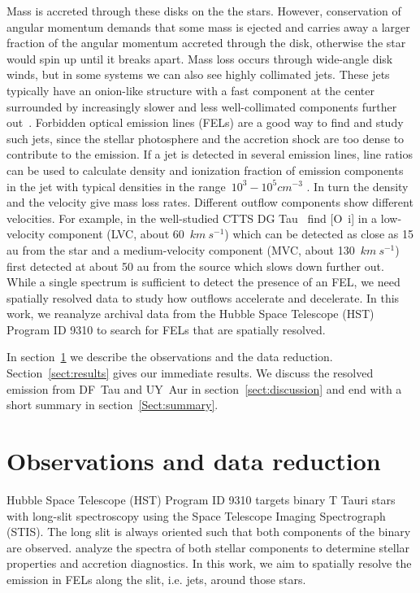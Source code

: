 \documentclass[twocolumn]{aastex62}
\begin{document}
Mass is accreted through these disks on the the stars. However,
conservation of angular momentum demands that some mass is ejected and
carries away a larger fraction of the angular momentum accreted through
the disk, otherwise the star would spin up until it breaks apart. Mass
loss occurs through wide-angle disk winds, but in some systems we can
also see highly collimated jets. These jets typically have an onion-like
structure with a fast component at the center surrounded by increasingly
slower and less well-collimated components further
out~\cite{2000ApJ...537L..49B}. Forbidden optical emission lines (FELs) are a
good way to find and study such jets, since the stellar photosphere and
the accretion shock are too dense to contribute to the emission. If a
jet is detected in several emission lines, line ratios can be used to
calculate density and ionization fraction of emission components in the
jet with typical densities in the range~$10^3-10^5cm^{-3}$
\citep[e.g.][]{1999A&A...342..717B,2000A&A...356L..41L,2013A&A...550L...1S}. In turn
the density and the velocity give mass loss rates. Different outflow
components show different velocities. For example, in the well-studied
CTTS DG Tau~\citet{2013A&A...550L...1S} find [O~{\sc i}] in a low-velocity
component (LVC, about 60~\(km\ s^{-1}\)) which can be detected as
close as 15 au from the star and a medium-velocity component (MVC, about
130~\(km\ s^{-1}\)) first detected at about 50 au from the source
which slows down further out. While a single spectrum is sufficient to
detect the presence of an FEL, we need spatially resolved data to study
how outflows accelerate and decelerate. In this work, we reanalyze
archival data from the Hubble Space Telescope (HST) Program ID 9310 to
search for FELs that are spatially resolved.

In section~\ref{sect:obs} we describe the observations and the data reduction. Section~\ref{sect:results} gives our immediate results. We discuss the resolved emission from DF~Tau and UY~Aur in section~\ref{sect:discussion} and end with a short summary in section~\ref{Sect:summary}.

\section{Observations and data reduction}
\label{sect:obs}

Hubble Space Telescope (HST) Program ID 9310 targets binary T Tauri
stars with long-slit spectroscopy using the Space Telescope Imaging
Spectrograph (STIS). The long slit is always oriented such that both
components of the binary are observed. \citet{2003ApJ...583..334H} analyze the
spectra of both stellar components to determine stellar properties and
accretion diagnostics. In this work, we aim to spatially resolve the
emission in FELs along the slit, i.e. jets, around those stars.
\end{document}
